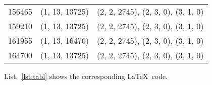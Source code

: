 \begin{center}
{\begin{tabularx}{\textwidth}{p{}|p{}|p{}}
			156465                 & (1, 13, 13725) & (2, 2, 2745), (2, 3, 0), (3, 1, 0)                  \\
			159210                 & (1, 13, 13725) & (2, 2, 2745), (2, 3, 0), (3, 1, 0)                  \\
			161955                 & (1, 13, 16470) & (2, 2, 2745), (2, 3, 0), (3, 1, 0)                  \\
			164700                 & (1, 13, 13725) & (2, 2, 2745), (2, 3, 0), (3, 1, 0)                  \\
			\hline
		\end{tabularx}
	}
\end{center}
\cleardoublepage









List.~\ref{lst:tabl} shows the corresponding \LaTeX \ code.

